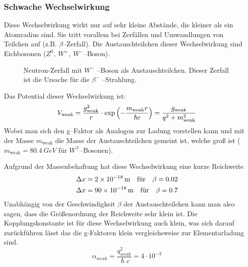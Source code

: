 \documentclass[Ex4_Zusammenfassung.tex]{subfiles}
\begin{document}
\subsubsection{Schwache Wechselwirkung}
Diese Wechselwirkung wirkt nur auf sehr kleine Abstände, die kleiner als ein Atomradius sind. Sie tritt vorallem bei Zerfällen und Umwandlungen von Teilchen auf (z.B.  $\beta$--Zerfall). Die Austauschteilchen dieser Wechselwirkung sind Eichbosonen ($Z^0,\ W^{+},\ W^{-}$--Boson).
\begin{figure}[H]
	\centering
	\caption{Neutron-Zerfall mit $W^-$ --Boson als Austauschteilchen. Dieser Zerfall ist die Ursache für die $ \beta^- $  --Strahlung.}
\end{figure}
Das Potential dieser Wechselwirkung ist:
\begin{equation}
	V_{\text{weak}} = \frac{g_{\text{weak}}^2}{r} \cdot \exp\left( -\frac{m_{\text{weak}} r}{\hslash c}\right) = \frac{g_{\text{weak}}}{q^2 + m_{\text{weak}}^2}
\end{equation}
Wobei man sich den g--Faktor als Analogon zur Ladung vorstellen kann und mit der Masse $ m_{\text{weak}} $ die Masse der Austauschteilchen gemeint ist, welche groß ist ( $m_{\text{weak}} = \SI{80.4}{GeV}$ für $ W^{\mp} $--Bosonen). 

Aufgrund der Massenbehaftung hat diese Wechselwirkung eine kurze Reichweite 
\begin{align}
	\Delta x &= \SI{2E-18}{m} \quad \text{für}  \quad \beta = 0.02 \\
	\Delta x &= \SI{90E-18}{m} \quad \text{für} \quad \beta = 0.7
\end{align} 
Unabhängig von der Geschwindigkeit $\beta$ der Austauschteilchen kann man also sagen, dass die Größenordnung der Reichweite sehr klein ist. Die Kopplungskonstante ist für diese Wechselwirkung auch klein, was sich darauf zurückführen lässt das die g-Faktoren klein vergleichsweise zur Elementarladung sind. 
\begin{equation}
	\alpha_{weak} = \frac{q_{weak}^2}{\hslash c} = 4 \cdot 10^{-3}
\end{equation} 
\end{document}

